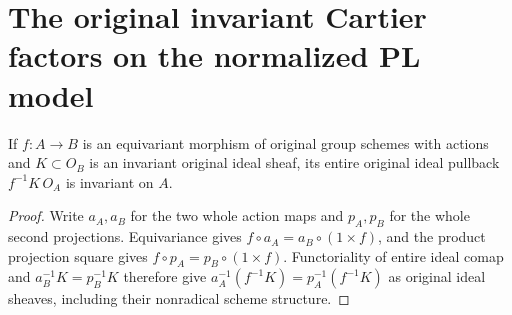\section{The original invariant Cartier factors on the normalized PL model}

\begin{lemma}
\label{lem:pl-original-equivariant-ideal-pullback}
\leanok
If $f:A\to B$ is an equivariant morphism of original group schemes with
actions and $K\subset O_B$ is an invariant original ideal sheaf, its entire
original ideal pullback $f^{-1}K\,O_A$ is invariant on $A$.
\end{lemma}
\begin{proof}
Write $a_A,a_B$ for the two whole action maps and $p_A,p_B$ for the whole
second projections. Equivariance gives
$f\circ a_A=a_B\circ(1\times f)$, and the product projection square gives
$f\circ p_A=p_B\circ(1\times f)$. Functoriality of entire ideal comap and
$a_B^{-1}K=p_B^{-1}K$ therefore give
$a_A^{-1}(f^{-1}K)=p_A^{-1}(f^{-1}K)$ as original ideal sheaves, including
their nonradical scheme structure.
\end{proof}

